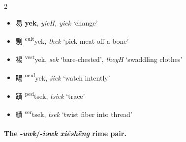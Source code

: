 \begin{multicols}{2}
\raggedcolumns

\begin{minipage}{\columnwidth}
\begin{itemize}[leftmargin=*, labelsep=0.5em]   
    \item {\Large{易}} %
    {\large{\textbf{yek}}},
    \textit{yieH, yiek} `change' %

    \item {\Large{剔}} %
    {\large{{\textsuperscript{cult}}yek}},
    \textit{thek} `pick meat off a bone' %


    \item \begin{flushleft} {\Large{裼}} %
    {\large{{\textsuperscript{vest}}yek}},
    \textit{sek} `bare-chested', \textit{theyH} `swaddling clothes' \end{flushleft}%
   
    \item {\Large{睗}} %
    {\large{{\textsuperscript{ocul}}yek}},
    \textit{śiek} `watch intently' %
\end{itemize}
\end{minipage}

\medskip

\begin{itemize}
    \item {\Large{蹟}} %
    {\large{{\textsuperscript{ped}}tsek}},
    \textit{tsiek} `trace' %

    \item  \begin{flushleft} {\Large{績}} %
    {\large{{\textsuperscript{ser}}tsek}},
    \textit{tsek} `twist  fiber into thread' \end{flushleft} %
\end{itemize}
\end{multicols}



\paragraph{The -\textit{uwk}/-\textit{iəwk} \textit{xiéshēng} rime pair.}
\label{par:uwk-iəwk-XS-pair}

